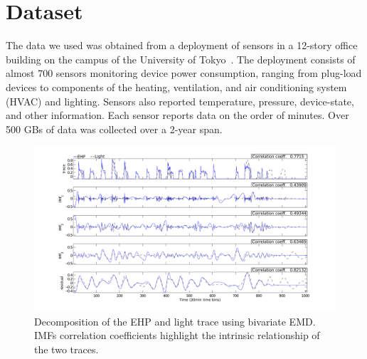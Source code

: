 \section{Dataset}
The data we used was obtained from a deployment of sensors in a 12-story office building
on the campus of the University of Tokyo~\cite{gutp, ogawa:lncs2011}.  The deployment consists of 
almost 700 sensors monitoring device power consumption, ranging from plug-load devices to components of the
heating, ventilation, and air conditioning system (HVAC) and lighting.  Sensors also reported temperature, 
pressure, device-state, and other information.  Each sensor reports data on the
order of minutes.  Over 500 GBs of data was collected over a 2-year span.

\begin{figure}[tb]
\hspace{-2cm}
\includegraphics[width=1.2\textwidth]{img/emd_25_26-eps-converted-to}
\vspace{-1cm}
\caption{Decomposition of the EHP and light trace using bivariate EMD. IMFs correlation coefficients highlight the intrinsic relationship of the two traces.}
\label{fig:emd}
\end{figure}



